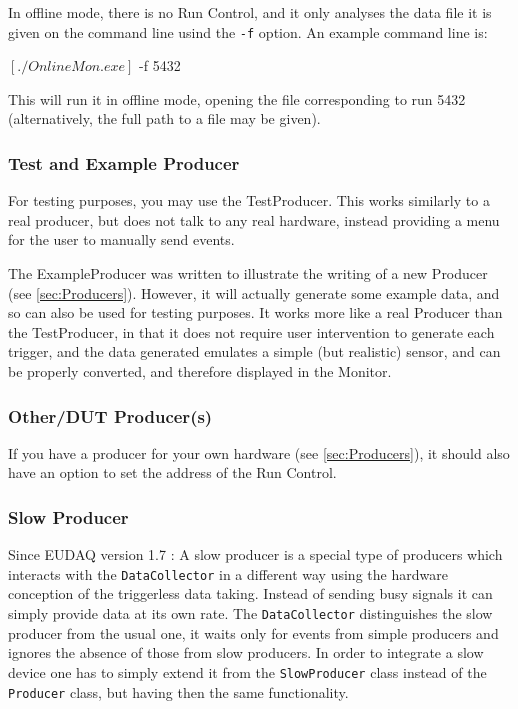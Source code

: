 In offline mode, there is no Run Control,
and it only analyses the data file it is given on the command line usind the \texttt{-f} option. 
An example command line is:
\begin{listing}[mybash]
$[./OnlineMon.exe]$ -f 5432
\end{listing}
This will run it in offline mode, opening the file corresponding to run 5432
(alternatively, the full path to a file may be given).

\subsubsection{Test and Example Producer}
\label{sec:testproducer}
For testing purposes, you may use the TestProducer.
This works similarly to a real producer, but does not talk to any real hardware,
instead providing a menu for the user to manually send events.

The ExampleProducer was written to illustrate the writing of a new Producer (see \autoref{sec:Producers}).
However, it will actually generate some example data, and so can also be used for testing purposes.
It works more like a real Producer than the TestProducer,
in that it does not require user intervention to generate each trigger,
and the data generated emulates a simple (but realistic) sensor,
and can be properly converted, and therefore displayed in the Monitor.

\subsubsection{Other/DUT Producer(s)}
If you have a producer for your own hardware (see \autoref{sec:Producers}),
it should also have an option to set the address of the Run Control.

\subsubsection{Slow Producer}
Since EUDAQ version 1.7 \cite{Shirokova:2016}: A slow producer is a special type of producers which interacts with the \texttt{DataCollector} in a different way using the hardware conception of the triggerless data taking. Instead of sending busy signals it can simply provide data at its own rate. The \texttt{DataCollector} distinguishes the slow producer from the usual one, it waits only for events from simple producers and ignores the absence of those from slow producers.
In order to integrate a slow device one has to simply extend it from the \texttt{SlowProducer} class instead of the \texttt{Producer} class, but having then the same functionality. 


